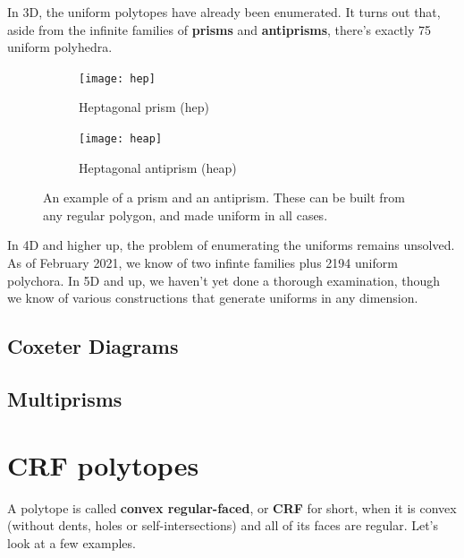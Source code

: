 \documentclass{article}
\begin{document}
In 3D, the uniform polytopes have already been enumerated. It turns out that, aside from the infinite families of \textbf{prisms} and \textbf{antiprisms}, there's exactly 75 uniform polyhedra. %

\begin{figure}[H]
\centering
\begin{subfigure}{.5\textwidth}
  \centering
  \texttt{[image: hep]}
  \caption{Heptagonal prism (hep)}
  \label{fig:hep}
\end{subfigure}%
\begin{subfigure}{.5\textwidth}
  \centering
  \texttt{[image: heap]}
  \caption{Heptagonal antiprism (heap)}
  \label{fig:heap}
\end{subfigure}%
\caption{An example of a prism and an antiprism. These can be built from any regular polygon, and made uniform in all cases.}
\label{fig:prisms}
\end{figure}

In 4D and higher up, the problem of enumerating the uniforms remains unsolved. As of February 2021, we know of two infinte families plus 2194 uniform polychora. In 5D and up, we haven't yet done a thorough examination, though we know of various constructions that generate uniforms in any dimension.

\subsection{Coxeter Diagrams}

\subsection{Multiprisms}

\section{CRF polytopes}
A polytope is called \textbf{convex regular-faced}, or \textbf{CRF} for short, when it is convex (without dents, holes or self-intersections) and all of its faces are regular. Let's look at a few examples.
\end{document}

